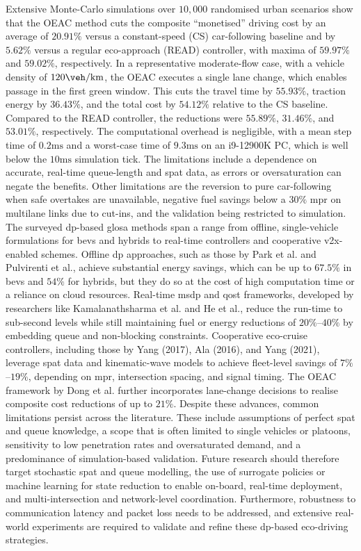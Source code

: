 Extensive Monte-Carlo simulations over $10,000$ randomised urban scenarios show that the OEAC method cuts the composite \enquote{monetised} driving cost by an average of $20.91\%$ versus a constant-speed (CS) car-following baseline and by $5.62\%$ versus a regular eco-approach (READ) controller, with maxima of $59.97\%$ and $59.02\%$, respectively. In a representative moderate-flow case, with a vehicle density of $120\unit{\veh\per\kilo\metre}$, the OEAC executes a single lane change, which enables passage in the first green window. This cuts the travel time by $55.93\%$, traction energy by $36.43\%$, and the total cost by $54.12\%$ relative to the CS baseline. Compared to the READ controller, the reductions were $55.89\%$, $31.46\%$, and $53.01\%$, respectively. The computational overhead is negligible, with a mean step time of $0.2\unit{\milli\second}$ and a worst-case time of $9.3\unit{\milli\second}$ on an i9-12900K PC, which is well below the $10\unit{\milli\second}$ simulation tick. The limitations include a dependence on accurate, real-time queue-length and \ac{spat} data, as errors or oversaturation can negate the benefits. Other limitations are the reversion to pure car-following when safe overtakes are unavailable, negative fuel savings below a $30\%$ \ac{mpr} on multilane links due to cut-ins, and the validation being restricted to simulation.
\mynewline
The surveyed \ac{dp}-based \ac{glosa} methods span a range from offline, single-vehicle formulations for \acp{bev} and hybrids to real-time controllers and cooperative \ac{v2x}-enabled schemes. Offline \ac{dp} approaches, such as those by Park et al. and Pulvirenti et al., achieve substantial energy savings, which can be up to $67.5\%$ in \acp{bev} and $54\%$ for hybrids, but they do so at the cost of high computation time or a reliance on cloud resources. Real-time \ac{msdp} and \ac{qost} frameworks, developed by researchers like Kamalanathsharma et al. and He et al., reduce the run-time to sub-second levels while still maintaining fuel or energy reductions of $20\%$--$40\%$ by embedding queue and non-blocking constraints. Cooperative eco-cruise controllers, including those by Yang (2017), Ala (2016), and Yang (2021), leverage \ac{spat} data and kinematic-wave models to achieve fleet-level savings of $7\%$--$19\%$, depending on \ac{mpr}, intersection spacing, and signal timing. The OEAC framework by Dong et al. further incorporates lane-change decisions to realise composite cost reductions of up to $21\%$.
Despite these advances, common limitations persist across the literature. These include assumptions of perfect \ac{spat} and queue knowledge, a scope that is often limited to single vehicles or platoons, sensitivity to low penetration rates and oversaturated demand, and a predominance of simulation-based validation. Future research should therefore target stochastic \ac{spat} and queue modelling, the use of surrogate policies or machine learning for state reduction to enable on-board, real-time deployment, and multi-intersection and network-level coordination. Furthermore, robustness to communication latency and packet loss needs to be addressed, and extensive real-world experiments are required to validate and refine these \ac{dp}-based eco-driving strategies.